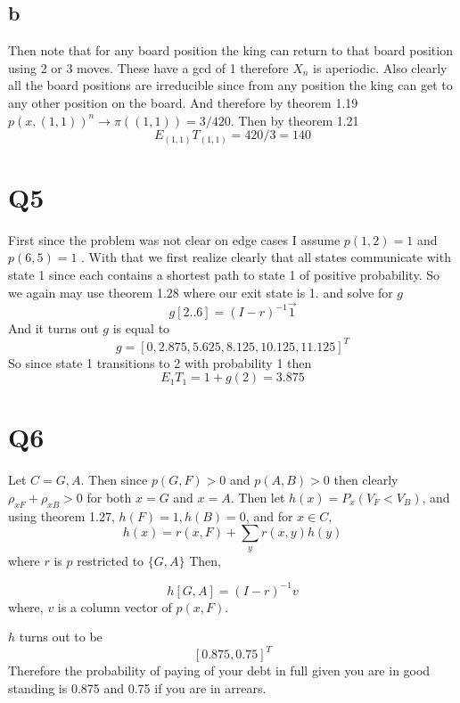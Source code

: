 \documentclass{article}
\begin{document}
\subsection*{b}
Then note that for any board position the king can return to that board position using 2 or 3 moves. These have a gcd of 1 therefore $X_n$ is aperiodic. Also clearly all the board positions are irreducible since from any position the king can get to any other position on the board. And therefore by theorem 1.19 
$p(x, (1,1))^n \rightarrow \pi((1,1)) = 3/420$. 
Then by theorem 1.21 
\[
E_{(1,1)} T_{(1,1)} = 420/3 = 140
\]


\section*{Q5}
First since the problem was not clear on edge cases I assume $p(1,2) = 1$ and $p(6,5) = 1$ . With that we first realize clearly that all states communicate with state 1 since each contains a shortest path to state 1 of positive probability. 
So we again may use theorem 1.28 where our exit state is 1. 
and solve for $g$
\[
g[2 .. 6] = (I - r)^{-1} \vec{1}
\]
And it turns out $g$ is equal to 
\[
g = [0 , 2.875,   5.625,   8.125,  10.125,  11.125]^T
\]
So since state 1 transitions to 2 with probability 1 then
\[
E_1T_1 = 1 + g(2) = 3.875
\]

\section*{Q6}
Let $C = {G,A}$. Then since $p(G,F) > 0$ and $p(A,B) > 0$ then clearly $\rho_{xF} + \rho_{xB} > 0 $ for both $x = G$ and $x= A$.
Then let $h(x) = P_x(V_F < V_B)$, and using theorem 1.27,
$h(F) = 1, h(B) = 0$, and for $x \in C$,
\[
h(x) = r(x,F) + \sum_y r(x,y)h(y)
\]
where $r$ is $p$ restricted to $\{G,A\}$
Then,

\[
h[G,A] = (I - r)^{-1}v
\]
where, $v$ is a column vector of $p(x,F)$.

$h$ turns out to be
\[
[ 0.875,  0.75 ]^T
\]
Therefore the probability of paying of your debt in full given you are in good standing is 0.875 and 0.75 if you are in arrears. 
\end{document}
